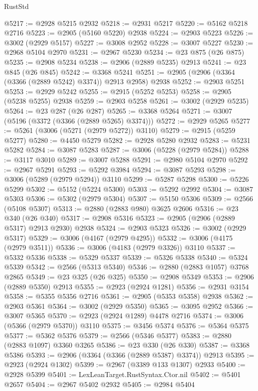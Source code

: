 \begin{lexlean}{RustStd}
\begin{coremodule}
{\begin{coremodule}
{{{{{{{{{{{{{{{{{{{{{{{{{{{{{{{{{{{{{{{{{{{{{{{{{{{{{{{{{{{{{{{{{{{{{{{{{{{{{{@5217 := @2928 @5215 @2932
@5218 := @2931 @5217
@5220 := @5162 @5218 @2716
@5223 := @2905 (@5160 @5220) @2938
@5224 := @2903 @5223
@5226 := @3002 (@2929 @5157)
@5227 := @3008 @2952
@5228 := @3007 @5227
@5230 := @2968 @5104 @2970
@5231 := @2967 @5230
@5234 := @23 @875 (@26 @875)
@5235 := @2908 @5234
@5238 := @2906 (@2889 @5235) @2913
@5241 := @23 @845 (@26 @845)
@5242 := @3368 @5241
@5251 := @2905 (@2906 (@3364 (@3366 (@2889 @5242) @3374)) @2913 @2958) @2938
@5252 := @2903 @5251
@5253 := @2929 @5242
@5255 := @2915 (@5252 @5253)
@5258 := @2905 (@5238 @5255) @2938
@5259 := @2903 @5258
@5261 := @3002 (@2929 @5235)
@5264 := @23 @287 (@26 @287)
@5265 := @3368 @5264
@5271 := @3007 (@5196 (@3372 (@3366 (@2889 @5265) @3374)))
@5272 := @2929 @5265
@5277 := @5261 (@3006 (@5271 (@2979 @5272)) @3110)
@5279 := @2915 (@5259 @5277)
@5280 := @4450 @5279
@5282 := @2928 @5280 @2932
@5283 := @5231 @5282
@5284 := @3087 @5283
@5287 := @3006 (@5228 (@2979 @5284))
@5288 := @3117 @3010
@5289 := @3007 @5288
@5291 := @2980 @5104 @2970
@5292 := @2967 @5291
@5293 := @5292 @3984
@5294 := @3087 @5293
@5298 := @3006 (@5289 (@2979 @5294)) @3110
@5299 := @5287 @5298
@5300 := @5226 @5299
@5302 := @5152 (@5224 @5300)
@5303 := @5292 @2992
@5304 := @3087 @5303
@5306 := @5302 (@2979 @5304)
@5307 := @5150 @5306
@5309 := @2566 (@5108 @5307)
@5313 := @2880 (@2883 @980) @3625 @2606
@5316 := @23 @340 (@26 @340)
@5317 := @2908 @5316
@5323 := @2905 (@2906 (@2889 @5317) @2913 @2930) @2938
@5324 := @2903 @5323
@5326 := @3002 (@2929 @5317)
@5329 := @3006 (@4167 (@2979 @4295))
@5332 := @3006 (@4175 (@2979 @3511))
@5336 := @3006 (@4183 (@2979 @3326)) @3110
@5337 := @5332 @5336
@5338 := @5329 @5337
@5339 := @5326 @5338
@5340 := @5324 @5339
@5342 := @2566 (@5313 @5340)
@5346 := @2880 (@2883 @1057) @3768 @2865
@5349 := @23 @325 (@26 @325)
@5350 := @2908 @5349
@5353 := @2906 (@2889 @5350) @2913
@5355 := @2923 (@2924 @1281)
@5356 := @2931 @3154
@5358 := @5355 @5356 @2716
@5361 := @2905 (@5353 @5358) @2938
@5362 := @2903 @5361
@5364 := @3002 (@2929 @5350)
@5365 := @3095 @2952
@5366 := @3007 @5365
@5370 := @2923 (@2924 @1289) @4478 @2716
@5374 := @3006 (@5366 (@2979 @5370)) @3110
@5375 := @3456 @5374
@5376 := @5364 @5375
@5377 := @5362 @5376
@5379 := @2566 (@5346 @5377)
@5383 := @2880 (@2883 @1097) @3360 @3265
@5386 := @23 @330 (@26 @330)
@5387 := @3368 @5386
@5393 := @2906 (@3364 (@3366 (@2889 @5387) @3374)) @2913
@5395 := @2923 (@2924 @1302)
@5399 := @2967 (@3389 @133 @1307) @2933
@5400 := @2928 @5399
@5401 := LexLeanTarget.RustSyntax.Ctor.nil
@5402 := @5401 @2657
@5404 := @2967 @5402 @2932
@5405 := @2984 @5404
}}}}}}}}}}}}}}}}}}}}}}}}}}}}}}}}}}}}}}}}}}}}}}}}}}}}}}}}}}}}}}}}}}}}}}}}}}}}}}
\end{coremodule}}
\end{coremodule}
\end{lexlean}
